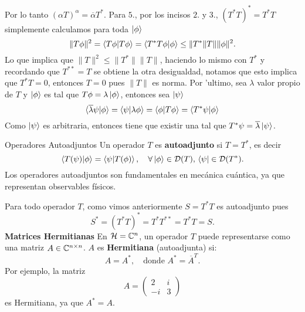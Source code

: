 \documentclass[main.tex]{subfiles}
\begin{document}
Por lo tanto $(\alpha T)^{\alpha}=\overline{\alpha}T^{*}$. Para $5.$, por los incisos $2.$ y $3.$, $(T^{*}T)^{*}=T^{*}T$ simplemente calculamos para toda $\ket{\phi}$
\[
  \|T\phi\|^{2}=\braket{T\phi|T\phi}=\braket{T^{*}T\phi|\phi}\leq\|T^{*}\|T\|\|\phi\|^{2}.
\]
Lo que implica que $\|T\|^{2}\leq\|T^{*}\|\|T\|$, haciendo lo mismo con $T^{*}$ y recordando que $T^{**}=T$ se obtiene la otra desigualdad, notamos que esto implica que $T^{*}T=0$, entonces $T=0$ pues $\|T\|$ es norma.
Por 'ultimo, sea $\lambda$ valor propio de $T$ y $\ket{\phi}$ es tal que $T\phi=\lambda\ket{\phi}$, entonces sea $\ket{\psi}$
\[
  \braket{\overline{\lambda}\psi|\phi}=\braket{\psi|\lambda\phi}=\braket{\phi|T\phi}=\braket{T^{*}\psi|\phi}
\]
Como $\ket{\psi}$ es arbitraria, entonces tiene que existir una tal que $T^{*}\psi=\overline{\lambda}\ket{\psi}$.
\begin{def.}{Operadores Autoadjuntos}
Un operador $T$ es \textbf{autoadjunto} si $T = T^*$, es decir
\[
  \braket{T(\psi)|\phi}=\braket{\psi| T(\phi)}, \quad \forall \ket{\phi} \in \mathcal{D}(T), \, \bra{\psi} \in \mathcal{D}(T^*).
\]
Los operadores autoadjuntos son fundamentales en mecánica cuántica, ya que representan observables físicos.
\end{def.}
\eje Para todo operador $T$, como vimos anteriormente $S=T^{*}T$ es autoadjunto pues
\[
  S^{*}=(T^{*}T)^{*}=T^{*}T^{**}=T^{*}T=S.
\]
\eje\textbf{Matrices Hermitianas}
En $\mathcal{H} = \mathbb{C}^n$, un operador $T$ puede representarse como una matriz $A\in\mathbb C ^{n \times n}$. $A$ es \textbf{Hermitiana} (autoadjunta) si:
\[
A = A^*, \quad \text{donde } A^* = \overline{A}^T.
\]
Por ejemplo, la matriz
\[
A = \begin{pmatrix}
2 & i \\
-i & 3
\end{pmatrix}
\]
es Hermitiana, ya que $A^* = A$.
\end{document}
